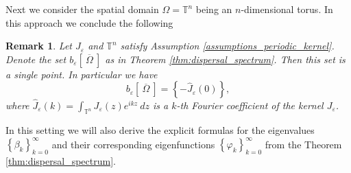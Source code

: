 \documentclass[12pt, a4paper]{article}
\theoremstyle{break}
\theoremstyle{break}
\theoremstyle{break}
\newtheorem{rem}{Remark}[section]
\theoremstyle{break}
\theoremstyle{break}
\newcommand{\Seq}[2]{\left\{#1_#2\right\}_{#2 = 0}^\infty}
\begin{document}
Next we consider the spatial domain $\Omega = \mathbb{T}^n$  being an $n$-dimensional torus. In this approach we conclude the following
\begin{rem}
    Let $J_\varepsilon$ and $\mathbb{T}^n$ satisfy Assumption \ref{assumptions_periodic_kernel}. Denote the set $b_\varepsilon \left[\: \overline{\Omega} \:\right]$ as in Theorem \ref{thm:dispersal_spectrum}. Then this set is a single point. In particular we have
    $$b_\varepsilon \left[\: \overline{\Omega} \:\right] = \left\{ - \hat{J}_\varepsilon(0) \right\},$$
    where $\hat{J}_\varepsilon(k) = \int_{\mathbb{T}^n} J_\varepsilon(z) e^{ikz}\:dz$ is a $k$-th Fourier coefficient of the kernel $J_\varepsilon$. \label{rem:dispersal_periodic_spectrum}
\end{rem}
In this setting we will also derive the explicit formulas for the eigenvalues $\Seq{\beta}{k}$ and their corresponding eigenfunctions $\Seq{\varphi}{k}$ from the Theorem \ref{thm:dispersal_spectrum}.
\end{document}
